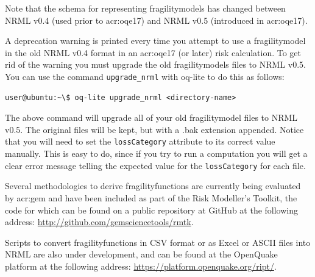 Note that the schema for representing \glspl{fragilitymodel} has changed
between NRML v0.4 (used prior to \gls{acr:oqe17}) and NRML v0.5 (introduced in
\gls{acr:oqe17}).

A deprecation warning is printed every time you attempt to use a
\gls{fragilitymodel} in the old NRML v0.4 format in an \gls{acr:oqe17} (or
later) risk calculation. To get rid of the warning you must upgrade the old
\glspl{fragilitymodel} files to NRML v0.5. You can use the command
\Verb+upgrade_nrml+ with oq-lite to do this as follows:

\begin{verbatim}
user@ubuntu:~\$ oq-lite upgrade_nrml <directory-name>
\end{verbatim}

The above command will upgrade all of your old \gls{fragilitymodel} files to
NRML v0.5. The original files will be kept, but with a .bak extension
appended. Notice that you will need to set the \Verb+lossCategory+ attribute
to its correct value manually. This is easy to do, since if you try to run a
computation you will get a clear error message telling the expected value for
the \Verb+lossCategory+ for each file.


Several methodologies to derive \glspl{fragilityfunction} are currently being
evaluated by \gls{acr:gem} and have been included as part of the Risk
Modeller's Toolkit, the code for which can be found on a public repository at
GitHub at the following address: 
\href{http://github.com/gemsciencetools/rmtk}{http://github.com/gemsciencetools/rmtk}.

Scripts to convert \glspl{fragilityfunction} in CSV format or as Excel or
ASCII files into NRML are also under development, and can be found at the
OpenQuake platform at the following address:
\href{https://platform.openquake.org/ript/}{https://platform.openquake.org/ript/}.
